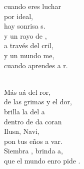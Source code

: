 \documentclass[12pt]{article}
\begin{document}
\begin{multicols*}{2}
\begin{cancion}
	cuando eres luchar\\
	por  ideal,\\
	hay  sonrisa s.\\
	y un rayo de ,\\
	a través del cril,  \\
	y un mundo me,\\
	cuando aprendes a r.\\\jump\\
	\begin{chorus}%
	Más aá del ror,\\
	de las grimas y el dor, \\
	brilla la  del a\\
	dentro de da coran\\
	Ilusn, Navi, \\
	pon tus eños a var.\\
	Siembra , brinda a,\\
	que el mundo enro pide .\\
	\end{chorus}%
	\jump\\
\end{cancion}%


\end{multicols*}
\end{document}
